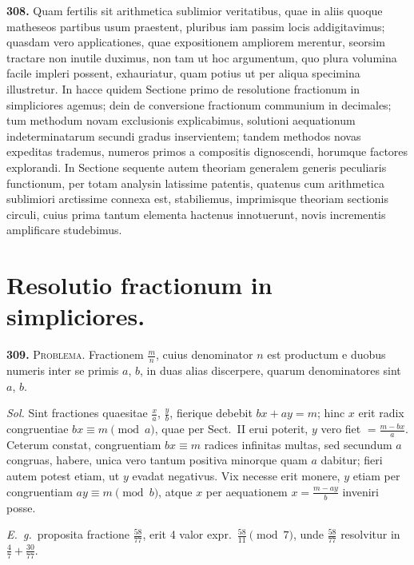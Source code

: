 \documentclass[12pt,a4paper]{article}
\theoremstyle{plain}
\theoremstyle{definition}
\theoremstyle{remark}
\begin{document}
\textbf{308.} Quam fertilis sit arithmetica sublimior veritatibus, quae in aliis quoque matheseos partibus usum praestent, pluribus iam passim locis addigitavimus; quasdam vero applicationes, quae expositionem ampliorem merentur, seorsim tractare non inutile duximus, non tam ut hoc argumentum, quo plura volumina facile impleri possent, exhauriatur, quam potius ut per aliqua specimina illustretur. In hacce quidem Sectione primo de resolutione fractionum in simpliciores agemus; dein de conversione fractionum communium in decimales; tum methodum novam exclusionis explicabimus, solutioni aequationum indeterminatarum secundi gradus inservientem; tandem methodos novas expeditas trademus, numeros primos a compositis dignoscendi, horumque factores explorandi. In Sectione sequente autem theoriam generalem generis peculiaris functionum, per totam analysin latissime patentis, quatenus cum arithmetica sublimiori arctissime connexa est, stabiliemus, imprimisque theoriam sectionis circuli, cuius prima tantum elementa hactenus innotuerunt, novis incrementis amplificare studebimus.

\section*{Resolutio fractionum in simpliciores.}

\textbf{309.} \textsc{Problema.} Fractionem $\frac{m}{n}$, cuius denominator $n$ est productum e duobus numeris inter se primis $a$, $b$, in duas alias discerpere, quarum denominatores sint $a$, $b$.

\textit{Sol.} Sint fractiones quaesitae $\frac{x}{a}$, $\frac{y}{b}$, fierique debebit $bx + ay = m$; hinc $x$ erit radix congruentiae $bx \equiv m \pmod{a}$, quae per Sect.~II erui poterit, $y$ vero fiet $= \frac{m-bx}{a}$. Ceterum constat, congruentiam $bx \equiv m$ radices infinitas multas, sed secundum $a$ congruas, habere, unica vero tantum positiva minorque quam $a$ dabitur; fieri autem potest etiam, ut $y$ evadat negativus. Vix necesse erit monere, $y$ etiam per congruentiam $ay \equiv m \pmod{b}$, atque $x$ per aequationem $x = \frac{m-ay}{b}$ inveniri posse.

\textit{E.~g.}~proposita fractione $\frac{58}{77}$, erit 4 valor expr.~$\frac{58}{11} \pmod{7}$, unde $\frac{58}{77}$ resolvitur in $\frac{4}{7} + \frac{30}{77}$.
\end{document}
